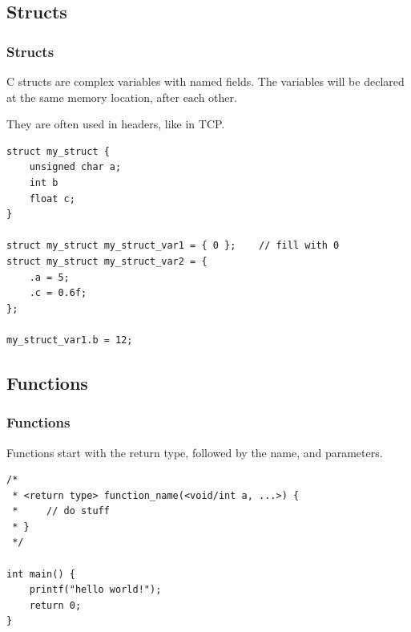 \documentclass[
	11pt, %
]{beamer}
\begin{document}
\begin{frame}[fragile]
    \subsection{Structs}
	\frametitle{Structs}

    C structs are complex variables with named fields.
    The variables will be declared at the same memory location, after each other.

    They are often used in headers, like in TCP.

    \bigskip

    \begin{lstlisting}[style=CStyle]
struct my_struct {
    unsigned char a;
    int b
    float c;
}

struct my_struct my_struct_var1 = { 0 };    // fill with 0
struct my_struct my_struct_var2 = {
    .a = 5;
    .c = 0.6f;
};

my_struct_var1.b = 12;

\end{lstlisting}

\end{frame}

\begin{frame}[fragile]
    \subsection{Functions}
	\frametitle{Functions}

    Functions start with the return type, followed by the name, and parameters.

    \bigskip

    \begin{lstlisting}[style=CStyle]
/*
 * <return type> function_name(<void/int a, ...>) {
 *     // do stuff
 * }
 */

int main() {
    printf("hello world!");
    return 0;
}

\end{lstlisting}

\end{frame}
\end{document}
